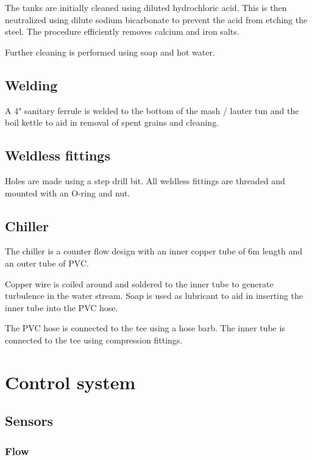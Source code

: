 \documentclass[11pt,fleqn,openany]{book} %
\begin{document}
The tanks are initially cleaned using diluted hydrochloric acid. This is then neutralized using dilute sodium bicarbonate to prevent the acid from etching the steel. The procedure efficiently removes calcium and iron salts.

Further cleaning is performed using soap and hot water.

\section{Welding}

A 4" sanitary ferrule is welded to the bottom of the mash / lauter tun and the boil kettle to aid in removal of spent grains and cleaning.

\section{Weldless fittings}

Holes are made using a step drill bit. All weldless fittings are threaded and mounted with an O-ring and nut.

\section{Chiller}

The chiller is a counter flow design with an inner copper tube of 6m length and an outer tube of PVC.

Copper wire is coiled around and soldered to the inner tube to generate turbulence in the water stream. Soap is used as lubricant to aid in inserting the inner tube into the PVC hose.

The PVC hose is connected to the tee using a hose barb. The inner tube is connected to the tee using compression fittings.



\chapter{Control system}

\section{Sensors}

\subsection{Flow}
\end{document}
